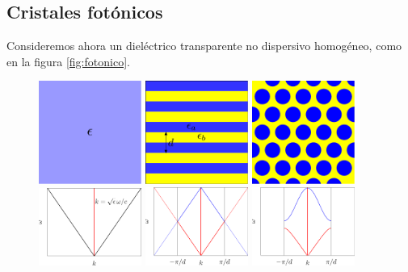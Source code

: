 \documentclass[12pt]{article}
\begin{document}
\subsection{Cristales fotónicos}
Consideremos ahora un dieléctrico transparente no dispersivo
homogéneo, como en la figura \ref{fig:fotonico}.
\begin{figure}
  \centering
  \includegraphics[width=0.3\textwidth]{fig7a}
  \includegraphics[width=0.3\textwidth]{fig7b}
  \includegraphics[width=0.3\textwidth]{fig7c}
  \\
  \includegraphics[width=0.3\textwidth]{fig7d}
  \includegraphics[width=0.3\textwidth]{fig7e}
  \includegraphics[width=0.3\textwidth]{fig7f}\\

\end{figure}
\end{document}
